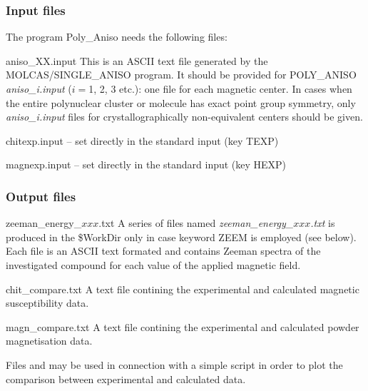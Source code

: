 %
\subsubsection{Input files}
The program Poly\_Aniso needs the following files:
\begin{filelist}
\item[aniso\_XX.input] This is an ASCII text file generated by the MOLCAS/SINGLE\_ANISO program.
It should be provided for POLY\_ANISO \textit {aniso\_i.input} ($i=$1, 2, 3 etc.): one file for each magnetic center.
In cases when the entire polynuclear cluster or molecule has exact point group symmetry, only
\textit{aniso\_i.input} files for crystallographically non-equivalent centers should be given.
\item[chitexp.input]  -- set directly in the standard input (key TEXP)
\item[magnexp.input]  -- set directly in the standard input (key HEXP)
\end{filelist}


\subsubsection{Output files}
\begin{filelist}
\item[zeeman\_energy\_$xxx$.txt]
A series of files named \textit{zeeman\_energy\_$xxx$.txt} is produced in the \$WorkDir only in case keyword ZEEM is
employed (see below). Each file is an ASCII text formated and contains Zeeman spectra of the investigated
compound for each value of the applied magnetic field.
\item[chit\_compare.txt]
A text file contining the experimental and calculated magnetic susceptibility data.
\item[magn\_compare.txt]
A text file contining the experimental and calculated powder magnetisation data.
\end{filelist}
Files  and  may be used in connection with a simple  script
in order to plot the comparison between experimental and calculated data.





